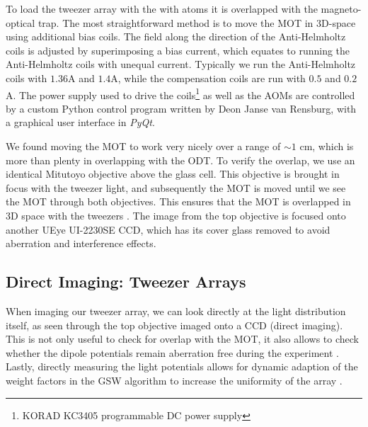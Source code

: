 To load the tweezer array with the with atoms it is overlapped with the magneto-optical trap. 
The most straightforward method is to move the MOT in 3D-space using additional bias coils.
The field along the direction of the Anti-Helmholtz coils is adjusted by superimposing a bias current, which equates to running the Anti-Helmholtz coils with unequal current. 
Typically we run the Anti-Helmholtz coils with $1.36$A and $1.4$A, while the compensation coils are run with $0.5$ and $0.2$A.
The power supply used to drive the coils\footnote{KORAD KC3405 programmable DC power supply} as well as the \ac{AOM}s are controlled by a custom Python control program written by Deon Janse van Rensburg, with a graphical user interface in \textit{PyQt}.

We found moving the MOT to work very nicely over a range of $\sim 1$ cm, which is more than plenty in overlapping with the \ac{ODT}.
To verify the overlap, we use an identical Mitutoyo objective above the glass cell.
This objective is brought in focus with the tweezer light, and subsequently the MOT is moved until we see the MOT through both objectives. 
This ensures that the MOT is overlapped in 3D space with the tweezers .
The image from the top objective is focused onto another UEye UI-2230SE \ac{CCD}, which has its cover glass removed to avoid aberration and interference effects. 




\subsection{Direct Imaging: Tweezer Arrays}\label{sec:TweezerImaging}

When imaging our tweezer array, we can look directly at the light distribution itself, as seen through the top objective imaged onto a CCD (direct imaging).
This is not only useful to check for overlap with the MOT, it also allows to check whether the dipole potentials remain aberration free during the experiment \cite{Baumgaertner2017}.
Lastly, directly measuring the light potentials allows for dynamic adaption of the weight factors in the \ac{GSW} algorithm to increase the uniformity of the array \cite{Nogrette2014}.

